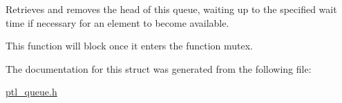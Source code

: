 Retrieves and removes the head of this queue, waiting up to the specified wait time if necessary for an element to become available. 

This function will block once it enters the function mutex. 

The documentation for this struct was generated from the following file:\begin{CompactItemize}
\item 
\hyperlink{ptl__queue_8h}{ptl\_\-queue.h}\end{CompactItemize}
